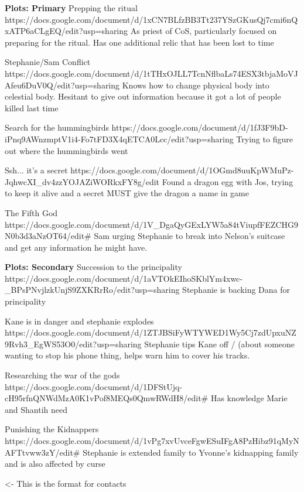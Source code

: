 \documentclass[char]{GL2020}
\begin{document}
\textbf{Plots: Primary}
Prepping the ritual
https://docs.google.com/document/d/1xCN7BLfzBB3Tt237YSzGKusQj7cmi6nQxATP6aCLgEQ/edit?usp=sharing
As priest of CoS, particularly focused on preparing for the ritual.  Has one additional relic that has been lost to time

Stephanie/Sam Conflict
https://docs.google.com/document/d/1tTHxOJLL7TcnNflbaLs74ESX3tbjaMoVJAfeu6DuV0Q/edit?usp=sharing
Knows how to change physical body into celestial body.  Hesitant to give out information because it got a lot of people killed last time

Search for the hummingbirds
https://docs.google.com/document/d/1fJ3F9bD-iPnq9AWnzmptV1i4-Fo7tFD3X4qETCA0Lcc/edit?usp=sharing
Trying to figure out where the hummingbirds went

Ssh... it's a secret
https://docs.google.com/document/d/1OGmd8uuKpWMuPz-JqhwcXI_dv4zzYOJAZiWORkxFY8g/edit
Found a dragon egg with Jos, trying to keep it alive and a secret
MUST give the dragon a name in game

The Fifth God
https://docs.google.com/document/d/1V_DgaQyGExLYW5a84tViupfFEZCHG9N0b3d3aNzOT64/edit#
Sam urging Stephanie to break into Nelson’s suitcase and get any information he might have.

\textbf{Plots: Secondary}
Succession to the principality
https://docs.google.com/document/d/1aVTOkEIhoSKblYm4xwc-_BPsPNvjlzkUnjS9ZXKRrRo/edit?usp=sharing
Stephanie is backing Dana for principality

Kane is in danger and stephanie explodes
https://docs.google.com/document/d/1ZTJBSiFyWTYWED1Wy5Cj7zdUpxuNZ9Rvh3_EgWS53O0/edit?usp=sharing
Stephanie \cDisney{} tips Kane \cTechStar{} off / (about someone wanting to stop his phone thing, helps warn him to cover his tracks. 

Researching the war of the gods
https://docs.google.com/document/d/1DFStUjq-cH95rfnQNWdMzA0K1vPof8MEQs0QmwRWdH8/edit#
Has knowledge Marie and Shantih need

Punishing the Kidnappers
https://docs.google.com/document/d/1vPg7xvUvceFgwESuIFgA8PzHibz91qMyNAFTtvww3zY/edit#
Stephanie is extended family to Yvonne's kidnapping family and is also affected by curse


\begin{itemz}[Goals]
	\item 
\end{itemz}

\begin{itemz}[Notes]
	\item 
\end{itemz}

\begin{contacts}
	\contact{\cTest{}} <- This is the format for contacts 
\end{contacts}
\end{document}
